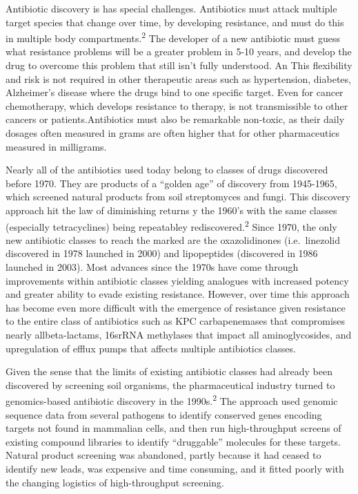 \documentclass[
]{book}
\begin{document}
Antibiotic discovery is has special challenges. Antibiotics must attack multiple target species that change over time, by developing resistance, and must do this in multiple body compartments.\textsuperscript{2} The developer of a new antibiotic must guess what resistance problems will be a greater problem in 5-10 years, and develop the drug to overcome this problem that still isn't fully understood. An This flexibility and risk is not required in other therapeutic areas such as hypertension, diabetes, Alzheimer's disease where the drugs bind to one specific target. Even for cancer chemotherapy, which develops resistance to therapy, is not transmissible to other cancers or patients.Antibiotics must also be remarkable non-toxic, as their daily dosages often measured in grams are often higher that for other pharmaceutics measured in milligrams.

Nearly all of the antibiotics used today belong to classes of drugs discovered before 1970. They are products of a ``golden age'' of discovery from 1945-1965, which screened natural products from soil streptomyces and fungi. This discovery approach hit the law of diminishing returns y the 1960's with the same classes (especially tetracyclines) being repeatabley rediscovered.\textsuperscript{2} Since 1970, the only new antibiotic classes to reach the marked are the oxazolidinones (i.e.~linezolid discovered in 1978 launched in 2000) and lipopeptides (discovered in 1986 launched in 2003). Most advances since the 1970s have come through improvements within antibiotic classes yielding analogues with increased potency and greater ability to evade existing resistance. However, over time this approach has become even more difficult with the emergence of resistance given resistance to the entire class of antibiotics such as KPC carbapenemases that compromises nearly allbeta-lactams, 16srRNA methylases that impact all aminoglycosides, and upregulation of efflux pumps that affects multiple antibiotics classes.

Given the sense that the limits of existing antibiotic classes had already been discovered by screening soil organisms, the pharmaceutical industry turned to genomics-based antibiotic discovery in the 1990s.\textsuperscript{2} The approach used genomic sequence data from several pathogens to identify conserved genes encoding targets not found in mammalian cells, and then run high-throughput screens of existing compound libraries to identify ``druggable'' molecules for these targets. Natural product screening was abandoned, partly because it had ceased to identify new leads, was expensive and time consuming, and it fitted poorly with the changing logistics of high-throughput screening.
\end{document}

